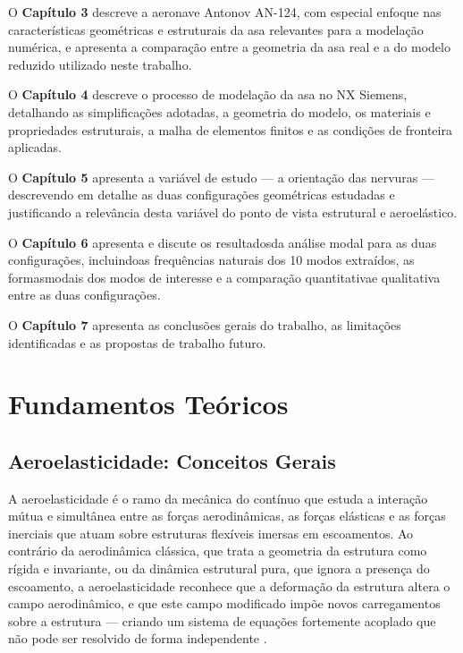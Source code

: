 \documentclass[a4paper,fleqn]{cas-sc}
\begin{document}
O \textbf{Capítulo 3} descreve a aeronave Antonov AN-124, com especial enfoque nas características geométricas e estruturais da asa relevantes para a modelação numérica, e apresenta a comparação entre a geometria da asa real e a do modelo reduzido utilizado neste trabalho.

O \textbf{Capítulo 4} descreve o processo de modelação da asa no NX Siemens, detalhando as simplificações adotadas, a geometria do modelo, os materiais e propriedades estruturais, a malha de elementos finitos e as condições de fronteira aplicadas.

O \textbf{Capítulo 5} apresenta a variável de estudo --- a orientação das nervuras --- descrevendo em detalhe as duas configurações geométricas estudadas e justificando a relevância desta variável do ponto de vista estrutural e aeroelástico.

O \textbf{Capítulo 6} apresenta e discute os resultadosda análise modal para as duas configurações, incluindoas frequências naturais dos 10 modos extraídos, as formasmodais dos modos de interesse e a comparação quantitativae qualitativa entre as duas configurações.

O \textbf{Capítulo 7} apresenta as conclusões gerais do trabalho, as limitações identificadas e as propostas de trabalho futuro.

\clearpage

\section{Fundamentos Teóricos}

\subsection{Aeroelasticidade: Conceitos Gerais}

A aeroelasticidade é o ramo da mecânica do contínuo que estuda a interação mútua e simultânea entre as forças aerodinâmicas, as forças elásticas e as forças inerciais que atuam sobre estruturas flexíveis imersas em escoamentos. Ao contrário da aerodinâmica clássica, que trata a geometria da estrutura como rígida e invariante, ou da dinâmica estrutural pura, que ignora a presença do escoamento, a aeroelasticidade reconhece que a deformação da estrutura altera o campo aerodinâmico, e que este campo modificado impõe novos carregamentos sobre a estrutura --- criando um sistema de equações fortemente acoplado que não pode ser resolvido de forma independente \cite{Bisplinghoff1996, Dowell2004}.
\end{document}
